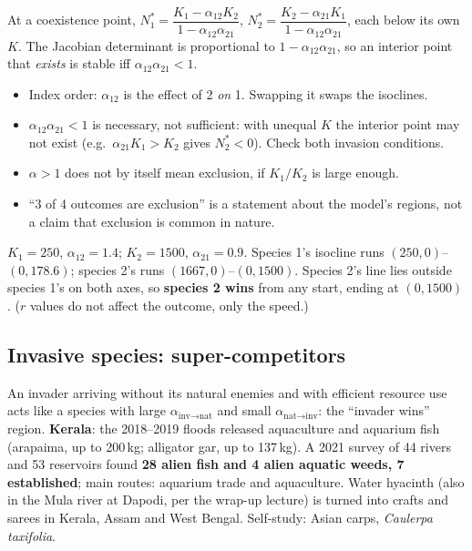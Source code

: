 At a coexistence point, $N_1^*=\dfrac{K_1-\alpha_{12}K_2}{1-\alpha_{12}\alpha_{21}}$,
$N_2^*=\dfrac{K_2-\alpha_{21}K_1}{1-\alpha_{12}\alpha_{21}}$, each below its own $K$. The Jacobian determinant is
proportional to $1-\alpha_{12}\alpha_{21}$, so an interior point that \emph{exists} is stable iff $\alpha_{12}\alpha_{21}<1$.

\begin{trap}
\begin{itemize}
\item Index order: $\alpha_{12}$ is the effect of 2 \emph{on} 1. Swapping it swaps the isoclines.
\item $\alpha_{12}\alpha_{21}<1$ is necessary, not sufficient: with unequal $K$ the interior point may not exist
(e.g.\ $\alpha_{21}K_1>K_2$ gives $N_2^*<0$). Check both invasion conditions.
\item $\alpha>1$ does not by itself mean exclusion, if $K_1/K_2$ is large enough.
\item ``3 of 4 outcomes are exclusion'' is a statement about the model's regions, not a claim that exclusion is common in
nature.
\end{itemize}
\end{trap}

\begin{worked}
$K_1=250$, $\alpha_{12}=1.4$; $K_2=1500$, $\alpha_{21}=0.9$. Species 1's isocline runs $(250,0)$--$(0,178.6)$; species 2's
runs $(1667,0)$--$(0,1500)$. Species 2's line lies outside species 1's on both axes, so \textbf{species 2 wins} from any
start, ending at $(0,1500)$. ($r$ values do not affect the outcome, only the speed.)
\end{worked}

\subsection{Invasive species: super-competitors}
An invader arriving without its natural enemies and with efficient resource use acts like a species with large
$\alpha_{\text{inv}\to\text{nat}}$ and small $\alpha_{\text{nat}\to\text{inv}}$: the ``invader wins'' region.
\textbf{Kerala}: the 2018--2019 floods released aquaculture and aquarium fish (arapaima, up to 200\,kg; alligator gar, up to
137\,kg). A 2021 survey of 44 rivers and 53 reservoirs found \textbf{28 alien fish and 4 alien aquatic weeds, 7
established}; main routes: aquarium trade and aquaculture. Water hyacinth (also in the Mula river at Dapodi, per the
wrap-up lecture) is turned into crafts and sarees in Kerala, Assam and West Bengal. Self-study: Asian carps,
\emph{Caulerpa taxifolia}.

